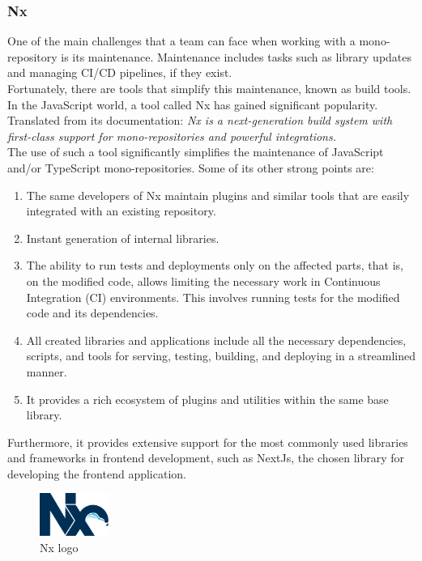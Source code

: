 \documentclass[../memory.tex]{subfiles}
\begin{document}
\subsubsection{Nx}
One of the main challenges that a team can face when working with a
mono-repository is its maintenance. Maintenance includes tasks such as library
updates and managing CI/CD pipelines, if they exist.
\\
Fortunately, there are tools that simplify this maintenance, known as build
tools. In the JavaScript world, a tool called Nx has gained significant
popularity. Translated from its documentation: \emph{Nx is a next-generation build
	system with first-class support for mono-repositories and powerful
	integrations.}\cite{nx}
\\[8pt]
The use of such a tool significantly simplifies the maintenance of JavaScript
and/or TypeScript mono-repositories. Some of its other strong points are:
\begin{enumerate}
	\item The same developers of Nx maintain plugins and similar tools that are
	      easily integrated with an existing repository.
	\item Instant generation of internal libraries.
	\item The ability to run tests and deployments only on the affected parts,
	      that is, on the modified code, allows limiting the necessary work in
	      Continuous Integration (CI) environments. This involves running tests for
	      the modified code and its dependencies.
	\item All created libraries and applications include all the necessary
	      dependencies, scripts, and tools for serving, testing, building, and
	      deploying in a streamlined manner.
	\item It provides a rich ecosystem of plugins and utilities within the same
	      base library.
\end{enumerate}
Furthermore, it provides extensive support for the most commonly used libraries
and frameworks in frontend development, such as NextJs, the chosen library for
developing the frontend application.
\begin{figure}[H]
	\centering
	\includegraphics[width=0.2\textwidth]{./assets/logos/nx-logo.png}
	\caption{Nx logo}
\end{figure}
\end{document}
